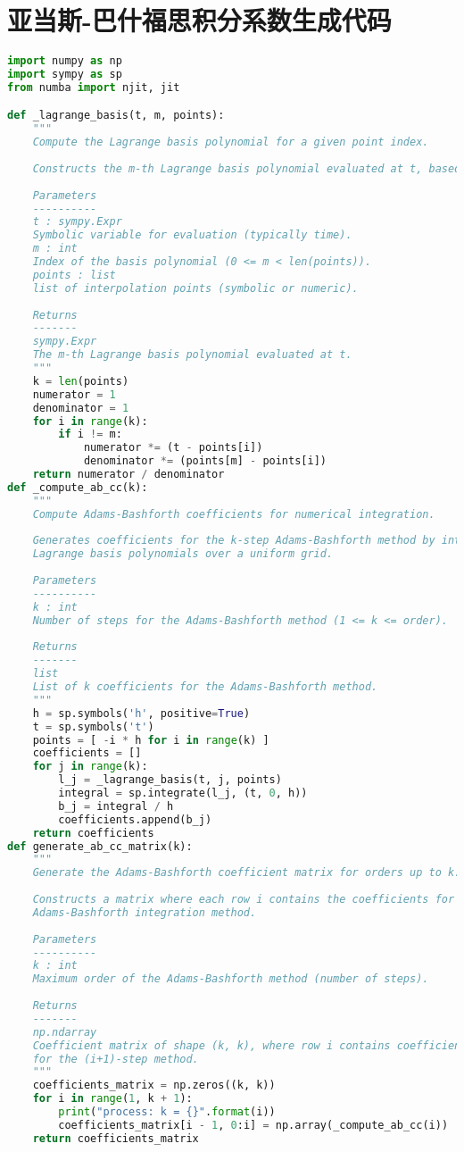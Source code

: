 \section{亚当斯-巴什福思积分系数生成代码}\label{app:ab_code}
\begin{lstlisting}[language=Python, caption={AB系数生成代码}, label={code:ab_generation}]
import numpy as np
import sympy as sp
from numba import njit, jit

def _lagrange_basis(t, m, points):
    """
	Compute the Lagrange basis polynomial for a given point index.
	
	Constructs the m-th Lagrange basis polynomial evaluated at t, based on a set of interpolation points.
	
	Parameters
	----------
	t : sympy.Expr
	Symbolic variable for evaluation (typically time).
	m : int
	Index of the basis polynomial (0 <= m < len(points)).
	points : list
	list of interpolation points (symbolic or numeric).
	
	Returns
	-------
	sympy.Expr
	The m-th Lagrange basis polynomial evaluated at t.
	"""
	k = len(points)
	numerator = 1
	denominator = 1
	for i in range(k):
		if i != m:
			numerator *= (t - points[i])
			denominator *= (points[m] - points[i])
	return numerator / denominator
def _compute_ab_cc(k):
	"""
	Compute Adams-Bashforth coefficients for numerical integration.
	
	Generates coefficients for the k-step Adams-Bashforth method by integrating
	Lagrange basis polynomials over a uniform grid.
	
	Parameters
	----------
	k : int
	Number of steps for the Adams-Bashforth method (1 <= k <= order).
	
	Returns
	-------
	list
	List of k coefficients for the Adams-Bashforth method.
	"""
	h = sp.symbols('h', positive=True)
	t = sp.symbols('t')
	points = [ -i * h for i in range(k) ]
	coefficients = []
	for j in range(k):
		l_j = _lagrange_basis(t, j, points)
		integral = sp.integrate(l_j, (t, 0, h))
		b_j = integral / h
		coefficients.append(b_j)
	return coefficients
def generate_ab_cc_matrix(k):
	"""
	Generate the Adams-Bashforth coefficient matrix for orders up to k.
	
	Constructs a matrix where each row i contains the coefficients for the (i+1)-step
	Adams-Bashforth integration method.
	
	Parameters
	----------
	k : int
	Maximum order of the Adams-Bashforth method (number of steps).
	
	Returns
	-------
	np.ndarray
	Coefficient matrix of shape (k, k), where row i contains coefficients
	for the (i+1)-step method.
	"""
	coefficients_matrix = np.zeros((k, k))
	for i in range(1, k + 1):
		print("process: k = {}".format(i))
		coefficients_matrix[i - 1, 0:i] = np.array(_compute_ab_cc(i))
	return coefficients_matrix
\end{lstlisting}


